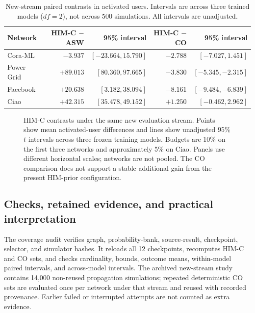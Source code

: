 \begin{table}[t]
\centering\small
\caption{New-stream paired contrasts in activated users. Intervals are across three trained models ($df=2$), not across 500 simulations. All intervals are unadjusted.}
\label{tab:coverage-contrasts}
\setlength{\tabcolsep}{12pt}
\begin{tabular}{@{}lrrrr@{}}
\toprule
Network & HIM-C $-$ ASW & 95\% interval & HIM-C $-$ CO & 95\% interval \\
\midrule
Cora-ML & $-3.937$ & $[-23.664, 15.790]$ & $-2.788$ & $[-7.027, 1.451]$ \\
Power Grid & $+89.013$ & $[80.360, 97.665]$ & $-3.830$ & $[-5.345, -2.315]$ \\
Facebook & $+20.638$ & $[3.182, 38.094]$ & $-8.161$ & $[-9.484, -6.839]$ \\
Ciao & $+42.315$ & $[35.478, 49.152]$ & $+1.250$ & $[-0.462, 2.962]$ \\
\bottomrule
\end{tabular}
\end{table}

\begin{figure}[t]
\centering

\caption{HIM-C contrasts under the same new evaluation stream. Points show mean activated-user differences and lines show unadjusted 95\% $t$ intervals across three frozen training models. Budgets are 10\% on the first three networks and approximately 5\% on Ciao. Panels use different horizontal scales; networks are not pooled. The CO comparison does not support a stable additional gain from the present HIM-prior configuration.}
\label{fig:coverage-contrasts}
\end{figure}

\subsection{Checks, retained evidence, and practical interpretation}
The coverage audit verifies graph, probability-bank, source-result, checkpoint, selector, and simulator hashes. It reloads all 12 checkpoints, recomputes HIM-C and CO sets, and checks cardinality, bounds, outcome means, within-model paired intervals, and across-model intervals. The archived new-stream study contains 14,000 non-reused propagation simulations; repeated deterministic CO sets are evaluated once per network under that stream and reused with recorded provenance. Earlier failed or interrupted attempts are not counted as extra evidence.

